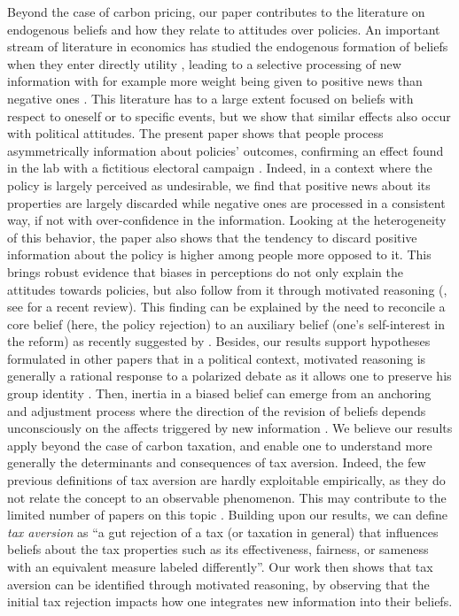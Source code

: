 \documentclass[11pt]{article}
\begin{document}

Beyond the case of carbon pricing, our paper contributes to the literature on endogenous beliefs and how they relate to attitudes over policies. An important stream of literature in economics has studied the endogenous formation of beliefs when they enter directly utility \citep[e.g.][]{benabou_self-confidence_2002}, leading to a selective processing of new information with for example more weight being given to positive news than negative ones \citep[][]{eil_good_2011,mobius_et_al_2011,sharot_et_al_2011}. This literature has to a large extent focused on beliefs with respect to oneself or to specific events, but we show that similar effects also occur with political attitudes. The present paper shows that people process asymmetrically information about policies' outcomes, confirming an effect found in the lab with a fictitious electoral campaign \citep{redlawsk_hot_2002}. Indeed, in a context where the policy is largely perceived as undesirable, we find that positive news about its properties are largely discarded while negative ones are processed in a consistent way, if not with over-confidence in the information. Looking at the heterogeneity of this behavior, the paper also shows that the tendency to discard positive information about the policy is higher among people more opposed to it. This brings robust evidence that biases in perceptions do not only explain the attitudes towards policies, but also follow from it through motivated reasoning (\citet{ziva_kunda_case_1990}, see \citet{benabou_mindful_2016} for a recent review). This finding can be explained by the need to reconcile a core belief (here, the policy rejection) to an auxiliary belief (one's self-interest in the reform) as recently suggested by \citet{little_distortion_2019}. Besides, our results support hypotheses formulated in other papers that in a political context, motivated reasoning is generally a rational response to a polarized debate \citep{kahan_ideology_2013} as it allows one to preserve his group identity \citep{druckman_evidence_2019}. Then, inertia in a biased belief can emerge from an anchoring and adjustment process where the direction of the revision of beliefs depends unconsciously on the affects triggered by new information \citep{taber_motivated_2001}. We believe our results apply beyond the case of carbon taxation, and enable one to understand more generally the determinants and consequences of tax aversion. Indeed, the few previous definitions of tax aversion \citep{sussman_axe_2011} are hardly exploitable empirically, as they do not relate the concept to an observable phenomenon. This may contribute to the limited number of papers on this topic \citep{kallbekken_et_al_2011,kessler_tax_2016}. Building upon our results, we can define \textit{tax aversion} as ``a gut rejection of a tax (or taxation in general) that influences beliefs about the tax properties such as its effectiveness, fairness, or sameness with an equivalent measure labeled differently''. Our work then shows that tax aversion can be identified through motivated reasoning, by observing that the initial tax rejection impacts how one integrates new information into their beliefs. 
\end{document}
